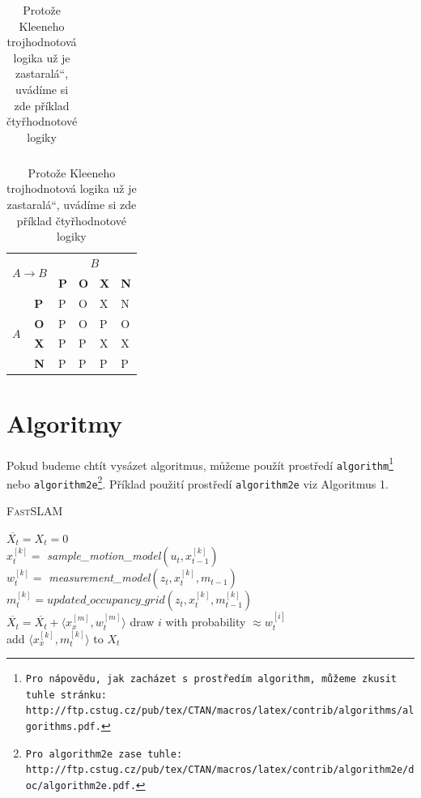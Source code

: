 \documentclass[a4paper, 11pt]{article}
\newcommand{\czuv}[1]{\quotedblbase #1\textquotedblleft}
\begin{document}
\begin{table}[h]
\begin{tabular}{|l|l|l|l|l|l|}
\end{tabular}
\begin{tabular}{|l|l|l|l|l|l|}
\hline
\multicolumn{2}{|c|}{\multirow{2}{*}{$A \rightarrow B$}} & \multicolumn{4}{c|}{$B$}                            \\ \cline{3-6} 
\multicolumn{2}{|c|}{}                       & \textbf{P} & \textbf{O} & \textbf{X} & \textbf{N} \\ \hline
\multirow{4}{*}{$A$}        & \textbf{P}       & P          & O          & X          & N          \\ \cline{2-6} 
                          & \textbf{O}       & P          & O          & P          & O          \\ \cline{2-6} 
                          & \textbf{X}       & P          & P          & X          & X          \\ \cline{2-6} 
                          & \textbf{N}       & P          & P          & P          & P          \\ \hline
\end{tabular}
\caption{Protože Kleeneho trojhodnotová logika už je \czuv{zastaralá}, uvádíme si zde příklad
čtyřhodnotové logiky}
\label{tab2}
\end{table}
\pagebreak

\section{Algoritmy}
Pokud budeme chtít vysázet algoritmus, můžeme použít prostředí
\texttt{algorithm\footnote{Pro nápovědu, jak zacházet s prostředím \texttt{algorithm}, můžeme zkusit tuhle stránku:
\\http://ftp.cstug.cz/pub/tex/CTAN/macros/latex/contrib/algorithms/algorithms.pdf.}}
nebo
\texttt{algorithm2e\footnote{Pro \texttt{algorithm2e} zase tuhle:
http://ftp.cstug.cz/pub/tex/CTAN/macros/latex/contrib/algorithm2e/doc/algorithm2e.pdf.}}.
Příklad použití prostředí \texttt{algorithm2e} viz Algoritmus 1.\\[0.5cm]

\begin{algorithm}[H]
\caption{\textsc{Fast}SLAM}
\label{alg1}
\SetNlSty{}{}{:  }
\BlankLine
\SetAlgoNoLine
{}
$\overline{X_t} = X_t = 0$\\
 {
$x_t^{[k]} =$ \emph{sample\_motion\_model}$(u_t,x_{t-1}^{[k]})$\\
$w_t^{[k]} =$ \emph{measurement\_model}$(z_t,x_t^{[k]},m_{t-1})$\\
$m_t^{[k]} = updated\_occupancy\_grid(z_t,x_t^{[k]},m_{t-1}^{[k]})$\\
$\overline{X_t} = \overline{X_t} + \langle x_x^{[m]},w_t^{[m]}\rangle$
}
 {
draw $i$ with probability $\approx w_t^{[i]}$\\
add $\langle x_x^{[k]},m_t^{[k]}\rangle$ to $X_t$\\
}
\end{algorithm}
\end{document}
